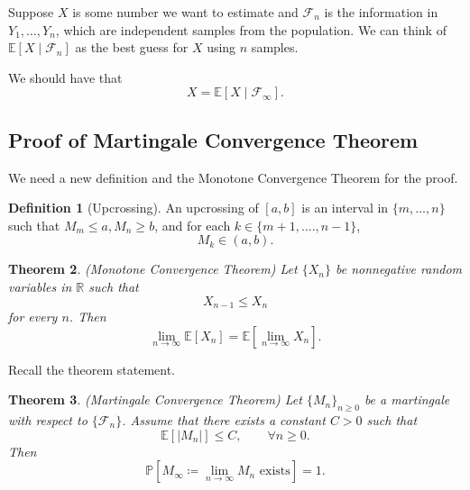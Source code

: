 \documentclass{tufte-handout}
\newcommand*\R{\mathbb{R}}
\newcommand*\E{\mathbb{E}}
\renewcommand*\P{\mathbb{P}}
\newtheorem{thm}{Theorem}[subsection]
\theoremstyle{definition}
\newtheorem{defn}[thm]{Definition}
\begin{document}
Suppose $X$ is some number we want to estimate and $\mathscr{F}_n$ is the information in $Y_1,\ldots,Y_n$, which are independent samples from the population. We can think of $\E\left[X \mid \mathscr{F}_n\right] $ as the best guess for $X$ using $n$ samples.

We should have that \[
	X = \E\left[X \mid \mathscr{F}_\infty\right] 
.\] 

\subsection{Proof of Martingale Convergence Theorem}

We need a new definition and the Monotone Convergence Theorem for the proof. 

\begin{defn}[Upcrossing]
	An upcrossing of $[a,b]$ is an interval in $\{m,\ldots,n\}$ such that $M_m \le a, M_n \ge b$, and for each $k \in \{m+1,\ldots.,n-1\}$, \[
		M_k \in (a,b)
	.\]
\end{defn}

\begin{thm}
	(Monotone Convergence Theorem) Let $\{X_n\}$ be nonnegative random variables in $\R$ such that \[
		X_{n-1} \le X_n
	\] for every $n$. Then \[
		\lim\limits_{n \to \infty} \E\left[X_n\right] = \E\left[\lim\limits_{n \to \infty} X_n\right] 
	.\] 
\end{thm}



Recall the theorem statement.

\begin{thm}
	(Martingale Convergence Theorem) Let $\{M_n\}_{n \ge 0}$ be a martingale with
	respect to $\{\mathscr{F}_n\}$. Assume that there exists a constant $C>0$ such
	that
	\[
		\E\left[ \left| M_n \right| \right] \le C, \qquad \forall n \ge 0
	.\] 
	Then
	\[
		\P\left[ M_\infty \coloneqq \lim_{n \to \infty} M_n \text{ exists} \right] = 1
	.\] 
\end{thm}
\end{document}
